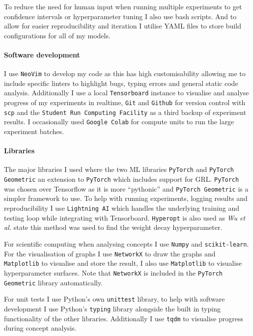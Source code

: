 To reduce the need for human input when running multiple experiments to get confidence intervals or hyperparameter tuning I also use bash scripts.
And to allow for easier reproducibility and iteration I utilise YAML files to store build configurations for all of my models.

\paragraph{Software development}

I use \texttt{NeoVim} to develop my code as this has high customisability allowing me to include specific linters to highlight bugs, typing errors and general static code analysis.
Additionally I use a local \texttt{Tensorboard} instance to visualise and analyse progress of my experiments in realtime, \texttt{Git} and \texttt{Github} for version control with \texttt{scp} and the \texttt{Student Run Computing Facility} as a third backup of experiment results.
I occasionally used \texttt{Google Colab} for compute units to run the large experiment batches.

\paragraph{Libraries}
\label{sec:libraries}

The major libraries I used where the two ML libraries \texttt{PyTorch}  and \texttt{PyTorch Geometric} \cite{Fey/Lenssen/2019} an extension to \texttt{PyTorch} which includes support for GRL.
\texttt{PyTorch} was chosen over Tensorflow as it is more ``pythonic'' and \texttt{PyTorch Geometric} is a simpler framework to use.
To help with running experiments, logging results and reproducibility I use \texttt{Lightning AI} which handles the underlying training and testing loop while integrating with Tensorboard.
\texttt{Hyperopt} is also used as \textit{Wu et al.}\cite{wu2019simplifying} state this method was used to find the weight decay hyperparameter.

For scientific computing when analysing concepts I use \texttt{Numpy} and \texttt{scikit-learn}. For the visualisation of graphs I use \texttt{NetworkX} to draw the graphs and \texttt{Matplotlib} to visualise and store the result, I also use \texttt{Matplotlib} to visualise hyperparameter surfaces. Note that \texttt{NetworkX} is included in the \texttt{PyTorch Geometric} library automatically.

For unit tests I use Python's own \texttt{unittest} library, to help with software development I use Python's \texttt{typing} library alongside the built in typing functionality of the other libraries. Additionally I use \texttt{tqdm} to visualise progress during concept analysis.

